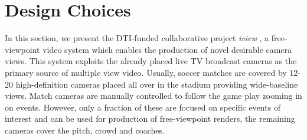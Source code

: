 
\section{Design Choices}
In this section, we present the DTI-funded collaborative project \textit{iview} \cite{iview_project},
a free-viewpoint video system which enables the production of novel desirable camera views.
This system exploits the already placed live TV broadcast cameras as the primary
source of multiple view video.
Usually, soccer matches are covered by 12-20 high-definition cameras placed all over in the stadium
providing wide-baseline views.
Match cameras are manually controlled to follow the game play zooming in on events.
However, only a fraction of these are focused on specific events of interest and can be used for production 
of free-viewpoint renders, the remaining cameras cover the pitch, crowd and coaches.







